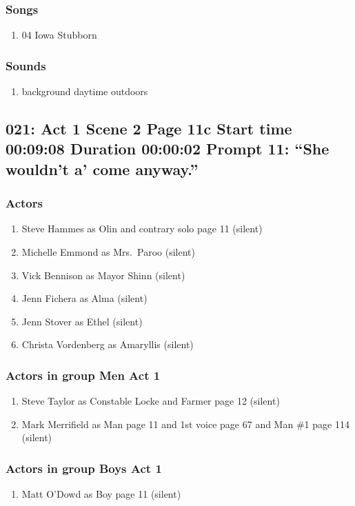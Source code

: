 \subsubsection{Songs}
\begin{enumerate}
\item 04 Iowa Stubborn
\end{enumerate}\subsubsection{Sounds}
\begin{enumerate}
\item background daytime outdoors
\end{enumerate}
\subsection{021: Act 1 Scene 2 Page 11c Start time 00:09:08 Duration 00:00:02 Prompt 11: ``She wouldn't a' come anyway.''}

\subsubsection{Actors}
\begin{enumerate}
\item Steve Hammes as Olin and contrary solo page 11 (silent)
\item Michelle Emmond as Mrs.~Paroo (silent)
\item Vick Bennison as Mayor Shinn (silent)
\item Jenn Fichera as Alma (silent)
\item Jenn Stover as Ethel (silent)
\item Christa Vordenberg as Amaryllis (silent)
\end{enumerate}
\subsubsection{Actors in group Men Act 1}
\begin{enumerate}
\item Steve Taylor as Constable Locke and Farmer page 12 (silent)
\item Mark Merrifield as Man page 11 and 1st voice page 67 and Man \#1 page 114 (silent)
\end{enumerate}
\subsubsection{Actors in group Boys Act 1}
\begin{enumerate}
\item Matt O'Dowd as Boy page 11 (silent)
\end{enumerate}

